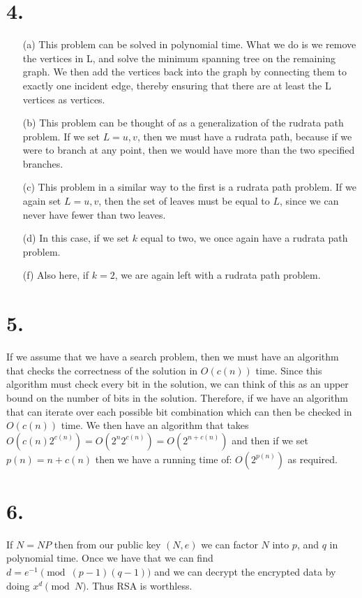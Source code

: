 \documentclass[11pt]{article}
\begin{document}
\section*{4.}
\begin{enumerate}
\item[(a)] This problem can be solved in polynomial time. What we do is we
remove the vertices in L, and solve the minimum spanning tree on the remaining
graph. We then add the vertices back into the graph by connecting them to
exactly one incident edge, thereby ensuring that there are at least the L
vertices as vertices. 
\item[(b)] This problem can be thought of as a generalization of the rudrata
path problem. If we set $L={u,v}$, then we must have a rudrata path, because if
we were to branch at any point, then we would have more than the two specified
branches. 
\item[(c)] This problem in a similar way to the first is a rudrata path
problem. If we again set $L = {u,v}$, then the set of leaves must be equal to
$L$, since we can never have fewer than two leaves. 
\item[(d)] In this case, if we set $k$ equal to two, we once again have a
rudrata path problem. 
\item[(f)] Also here, if $k = 2$, we are again left with a rudrata path
problem. 
\end{enumerate}
\newpage
\section*{5.}
If we assume that we have a search problem, then we must have an algorithm that
checks the correctness of the solution in $O(c(n))$ time. Since this algorithm
must check every bit in the solution, we can think of this as an upper bound on
the number of bits in the solution. Therefore, if we have an algorithm that can
iterate over each possible bit combination which can then be checked in
$O(c(n))$ time. We then have an algorithm that takes $O(c(n)2^{c(n)}) =
O(2^n2^{c(n)}) = O(2^{n + c(n)})$ and then if we set $p(n) = n + c(n)$ then we
have a running time of: $O(2^{p(n)})$ as required.
\newpage
\section*{6.}
If $N = NP$ then from our public key $(N, e)$ we can factor $N$ into $p$, and
$q$ in polynomial time. Once we have that we can find $d = e^{-1}
\pmod{(p-1)(q-1)}$ and we can decrypt the encrypted data by doing $x^d
\pmod{N}$. Thus RSA is worthless. 
\end{document}
